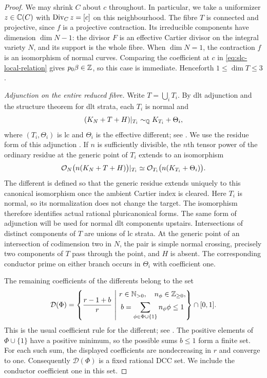 \begin{proof}
We may shrink $C$ about $c$ throughout.  In particular, we take a
uniformizer $z\in\mathbb C(C)$ with $\operatorname{Div}_C z=[c]$ on this
neighbourhood.  The fibre $T$ is connected and projective, since $f$ is
a projective contraction.  Its irreducible components have dimension
$\dim N-1$: the divisor $F$ is an effective Cartier divisor on the
integral variety $N$, and its support is the whole fibre.  When
$\dim N=1$, the contraction $f$ is an isomorphism of normal curves.
Comparing the coefficient at $c$ in
\eqref{eq:slc-local-relation} gives $p_0\beta\in\mathbb Z$, so this case is
immediate.  Henceforth $1\leq\dim T\leq3$.

\smallskip
\noindent\emph{Adjunction on the entire reduced fibre.}
Write $T=\bigcup_i T_i$.  By dlt adjunction and the structure theorem for
dlt strata, each $T_i$ is normal and
\begin{equation}
 \label{eq:slc-component-adjunction}
 (K_N+T+H)|_{T_i}\sim_{\mathbb Q}K_{T_i}+\Theta_i,
\end{equation}
where $(T_i,\Theta_i)$ is lc and $\Theta_i$ is the effective different;
see \cite[Sections~4.1--4.2 and Theorems~4.16 and~4.19]{Kollar2013}.
We use the residue form of this adjunction
\cite[Definition~11.14, author version]{KollarFamilies2023}.  If $n$ is sufficiently
divisible, the $n$th tensor power of the ordinary residue at the generic
point of $T_i$ extends to an isomorphism
\[
 \mathcal O_N\bigl(n(K_N+T+H)\bigr)|_{T_i}
   \simeq \mathcal O_{T_i}\bigl(n(K_{T_i}+\Theta_i)\bigr).
\]
The different is defined so that the generic residue extends uniquely
to this canonical isomorphism once the ambient Cartier index is
cleared.  Here $T_i$ is normal, so its normalization does not change
the target.  The isomorphism therefore identifies actual rational
pluricanonical forms.  The same form of adjunction will be used for
normal dlt components upstairs.
Intersections of distinct components of $T$ are unions of lc strata.
At the generic point of an intersection of codimension two in $N$, the
pair is simple normal crossing, precisely two components of $T$ pass
through the point, and $H$ is absent.  The corresponding conductor
prime on either branch occurs in $\Theta_i$ with coefficient one.

The remaining coefficients of the differents belong to the set
\begin{equation}
 \label{eq:slc-different-coefficients}
 \mathcal D(\Phi)=
 \left\{
   \frac{r-1+b}{r}\ \middle|\
   \begin{gathered}
    r\in\mathbb N_{>0},\quad n_\phi\in\mathbb Z_{\geq0},\\
    b=\sum_{\phi\in\Phi\cup\{1\}}n_\phi\phi\leq1
   \end{gathered}
 \right\}\cap[0,1].
\end{equation}
This is the usual coefficient rule for the different; see
\cite[Lemma~4.1]{HMX2014}.  The positive elements of
$\Phi\cup\{1\}$ have a positive minimum, so the possible sums $b\leq1$
form a finite set.  For each such sum, the displayed coefficients are
nondecreasing in $r$ and converge to one.  Consequently $\mathcal D(\Phi)$ is a
fixed rational DCC set.  We include the conductor coefficient one in
this set.


\end{proof}
